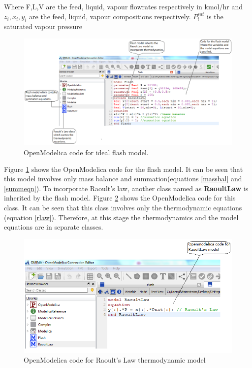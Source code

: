 \documentclass[12pt]{report}
\begin{document}
Where F,L,V are the feed, liquid, vapour flowrates respectively in kmol/hr and $z_i,x_i,y_i$  are the feed, liquid, vapour compositions respectively. $P_i^{sat}$ is the saturated vapour pressure  \\

\begin{figure}
\centering
\includegraphics[width=1\linewidth]{FLmodel}
\caption{OpenModelica code for ideal flash model.}
\label{8.1}
\end{figure}

Figure \ref{8.1} shows the OpenModelica code for the flash model. It can be seen that this model involves only mass balance and summation(equations \ref{massbal} and \ref{summeqn}). To incorporate Raoult's law, another class named as \textbf{RaoultLaw} is inherited by the flash model. Figure \ref{8.2} shows the OpenModelica code for this class. It can be seen that this class involves only the thermodynamic equations (equation \ref{rlaw}). Therefore, at this stage the thermodynamics and the model equations are in separate classes.


\begin{figure}
\centering
\includegraphics[width=0.9\linewidth]{RLmodel}
\caption{OpenModelica code for Raoult's Law thermodynamic model}
\label{8.2}
\end{figure}
\end{document}
